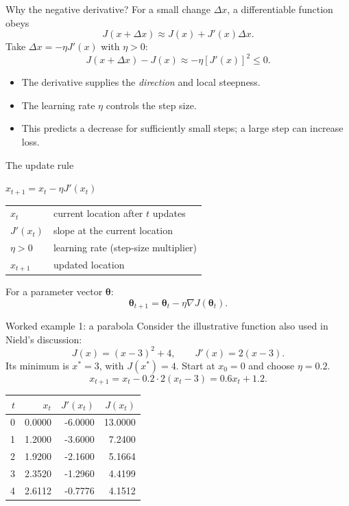 \documentclass[aspectratio=169,11pt]{beamer}
\begin{document}
\begin{frame}{Why the negative derivative?}
For a small change $\Delta x$, a differentiable function obeys
\[
J(x+\Delta x)\approx J(x)+J'(x)\Delta x.
\]
Take $\Delta x=-\eta J'(x)$ with $\eta>0$:
\[
J(x+\Delta x)-J(x)\approx-\eta[J'(x)]^2\leq 0.
\]
\begin{itemize}
\item The derivative supplies the \emph{direction} and local steepness.
\item The learning rate $\eta$ controls the step size.
\item This predicts a decrease for sufficiently small steps; a large step can increase loss.
\end{itemize}
\end{frame}

\begin{frame}{The update rule}
\begin{center}
{\Large $\boxed{x_{t+1}=x_t-\eta J'(x_t)}$}
\end{center}
\vspace{0.4cm}
\begin{tabular}{ll}
$x_t$ & current location after $t$ updates\\[5pt]
$J'(x_t)$ & slope at the current location\\[5pt]
$\eta>0$ & learning rate (step-size multiplier)\\[5pt]
$x_{t+1}$ & updated location\\
\end{tabular}

\vspace{0.5cm}
For a parameter vector $\boldsymbol\theta$:
\[
\boxed{\boldsymbol\theta_{t+1}=\boldsymbol\theta_t-\eta\nabla J(\boldsymbol\theta_t)}.
\]
\end{frame}

\begin{frame}{Worked example 1: a parabola}
Consider the illustrative function also used in Nield's discussion:
\[
J(x)=(x-3)^2+4,\qquad J'(x)=2(x-3).
\]
Its minimum is $x^*=3$, with $J(x^*)=4$. Start at $x_0=0$ and choose $\eta=0.2$.
\[
x_{t+1}=x_t-0.2\cdot2(x_t-3)=0.6x_t+1.2.
\]
\begin{center}
\begin{tabular}{rrrr}
\toprule
$t$ & $x_t$ & $J'(x_t)$ & $J(x_t)$\\
\midrule
0 & 0.0000 & -6.0000 & 13.0000\\
1 & 1.2000 & -3.6000 & 7.2400\\
2 & 1.9200 & -2.1600 & 5.1664\\
3 & 2.3520 & -1.2960 & 4.4199\\
4 & 2.6112 & -0.7776 & 4.1512\\
\bottomrule
\end{tabular}
\end{center}
\end{frame}
\end{document}
